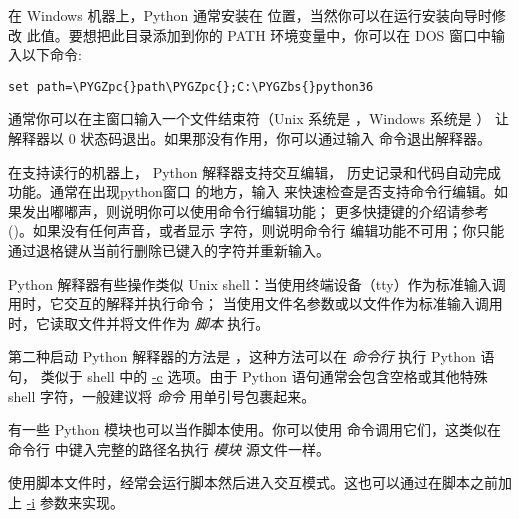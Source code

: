 \documentclass[a4paper,10pt,english]{sphinxmanual}
\def\PYGZbs{\char`\\}
\def\PYGZpc{\char`\%}
\begin{document}
在 Windows 机器上，Python 通常安装在  位置，当然你可以在运行安装向导时修改
此值。要想把此目录添加到你的 PATH 环境变量中，你可以在 DOS 窗口中输入以下命令:

\begin{Verbatim}[commandchars=\\\{\}]
set path=\PYGZpc{}path\PYGZpc{};C:\PYGZbs{}python36
\end{Verbatim}

通常你可以在主窗口输入一个文件结束符（Unix 系统是 ，Windows 系统是 ）
让解释器以 0 状态码退出。如果那没有作用，你可以通过输入  命令退出解释器。

在支持读行的机器上， Python 解释器支持交互编辑， 历史记录和代码自动完成功能。通常在出现python窗口
的地方，输入  来快速检查是否支持命令行编辑。如果发出嘟嘟声，则说明你可以使用命令行编辑功能；
更多快捷键的介绍请参考 {\hyperref[interactive:tut-interacting]{\emph{}}} ()。如果没有任何声音，或者显示  字符，则说明命令行
编辑功能不可用；你只能通过退格键从当前行删除已键入的字符并重新输入。

Python 解释器有些操作类似 Unix shell：当使用终端设备（tty）作为标准输入调用时，它交互的解释并执行命令；
当使用文件名参数或以文件作为标准输入调用时，它读取文件并将文件作为 \emph{脚本} 执行。

第二种启动 Python 解释器的方法是 ，这种方法可以在 \emph{命令行} 执行 Python 语句，
类似于 shell 中的 \href{https://docs.python.org/3/using/cmdline.html\#cmdoption-c}{-c} 选项。由于 Python 语句通常会包含空格或其他特殊 shell 字符，一般建议将 \emph{命令} 用单引号包裹起来。

有一些 Python 模块也可以当作脚本使用。你可以使用  命令调用它们，这类似在命令行
中键入完整的路径名执行 \emph{模块} 源文件一样。

使用脚本文件时，经常会运行脚本然后进入交互模式。这也可以通过在脚本之前加上 \href{https://docs.python.org/3/using/cmdline.html\#cmdoption-i}{-i} 参数来实现。
\end{document}

